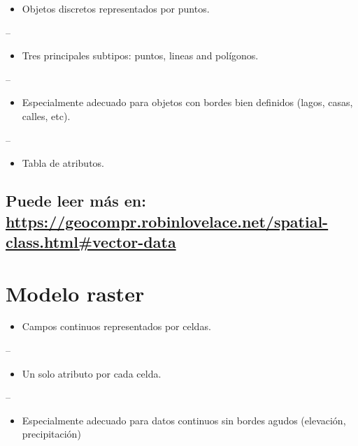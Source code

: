 \documentclass[]{article}
\providecommand{\tightlist}{%
  \setlength{\itemsep}{0pt}\setlength{\parskip}{0pt}}
\begin{document}
\begin{itemize}
\tightlist
\item
  Objetos discretos representados por puntos.
\end{itemize}

--

\begin{itemize}
\tightlist
\item
  Tres principales subtipos: puntos, lineas and polígonos.
\end{itemize}

--

\begin{itemize}
\tightlist
\item
  Especialmente adecuado para objetos con bordes bien definidos (lagos,
  casas, calles, etc).
\end{itemize}

--

\begin{itemize}
\tightlist
\item
  Tabla de atributos.
\end{itemize}

\subsection{\texorpdfstring{Puede leer más en:
\url{https://geocompr.robinlovelace.net/spatial-class.html\#vector-data}}{Puede leer más en: https://geocompr.robinlovelace.net/spatial-class.html\#vector-data}}\label{puede-leer-mas-en-httpsgeocompr.robinlovelace.netspatial-class.htmlvector-data}

\section{Modelo raster}\label{modelo-raster}

\begin{itemize}
\tightlist
\item
  Campos continuos representados por celdas.
\end{itemize}

--

\begin{itemize}
\tightlist
\item
  Un solo atributo por cada celda.
\end{itemize}

--

\begin{itemize}
\tightlist
\item
  Especialmente adecuado para datos continuos sin bordes agudos
  (elevación, precipitación)
\end{itemize}
\end{document}
